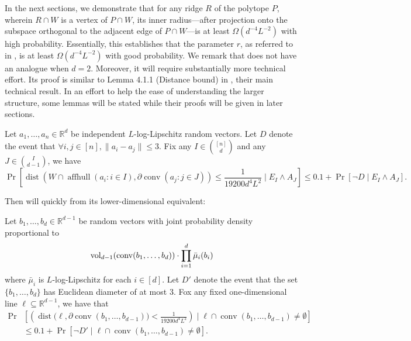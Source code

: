 \documentclass{theoretics}
\newcommand{\R}{\mathbb R}
\newcommand{\aff}{\operatorname{affhull}}
\newcommand{\conv}{\operatorname{conv}}
\newcommand{\dist}{\operatorname{dist}}
\newcommand{\vol}{\operatorname{vol}}
\renewcommand{\subset}{\subseteq}
\begin{document}
In the next sections, we demonstrate that for any ridge $R$ of the polytope $P$, wherein $R \cap W$ is a vertex of $P \cap W$, its inner radius—after projection onto the subspace orthogonal to the adjacent edge of $P \cap W$—is at least $\Omega(d^{-4}L^{-2})$ with high probability.
Essentially, this establishes that the parameter $r$, as referred to in , is at least $\Omega(d^{-4}L^{-2})$ with good probability.
We remark that  does not have an analogue when $d=2$.
Moreover, it will require substantially more technical effort.
Its proof is similar to Lemma 4.1.1 (Distance bound) in \cite{ST04}, their main technical result.
In an effort to help the ease of understanding the larger structure, some lemmas will be stated
while their proofs will be given in later sections.

\begin{lemma}\label{lem:rand-r-lb}
    Let $a_1, \ldots, a_n \in \R^d$ be independent $L$-log-Lipschitz random vectors.
    Let $D$ denote the event that $\forall i, j \in [n], \|a_i - a_j\| \leq 3$.
    Fix any $I \in \binom{[n]}{d}$
    and any $J \in \binom{I}{d-1}$, we have
    \[
        \Pr[\dist(W \cap \aff(a_i : i\in I),
        \partial \conv(a_j : j\in J )) \leq \frac{1}{19200 d^4L^2} \mid E_I \wedge A_J ] \leq 0.1 + \Pr[\neg D \mid E_I \wedge A_J].
    \]
\end{lemma}

Then  will  quickly from its lower-dimensional equivalent:
\begin{lemma}\label{lem:rand-r-b}
    Let $b_1,\dots,b_d \in \R^{d-1}$ be random vectors with joint probability density proportional to
    \begin{align*}
        \vol_{d-1}(\conv(b_1, \ldots, b_d)) \cdot \prod_{i=1}^d \Bar{\mu}_i(b_i)
    \end{align*}
    where $\bar{\mu}_i$ is $L$-log-Lipschitz for each $i \in [d]$.
    Let $D'$ denote the event that the set $\{b_1,\dots,b_d\}$ has Euclidean diameter of at most $3$.
    Fox any fixed one-dimensional line $\ell \subset \R^{d-1}$, we have that
    \begin{align*}
        \Pr&\left[ \left(\dist \big(\ell, \partial \conv(b_1,\dots,b_{d-1}) \big)
        < \frac{1}{19200 d^4 L^2} \right) \mid \ell \cap \conv(b_1,\dots,b_{d-1}) \neq \emptyset \right] \\
           &\leq 0.1 + \Pr[\neg D'\mid \ell \cap \conv(b_1,\dots,b_{d-1}) \neq \emptyset].
    \end{align*}
\end{lemma}
\end{document}
